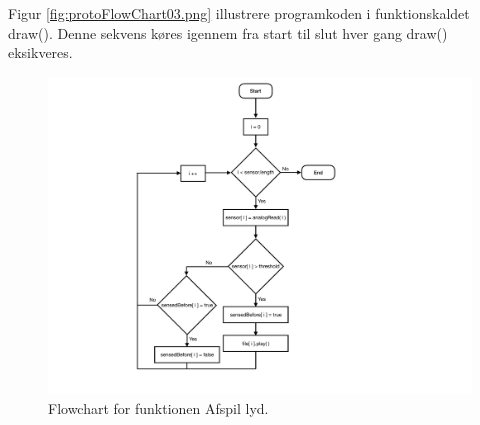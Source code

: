 Figur \ref{fig:protoFlowChart03.png} illustrere programkoden i funktionskaldet draw(). Denne sekvens køres igennem fra start til slut hver gang draw() eksikveres.            

\begin{figure}[H]
\centering
\includegraphics[scale=0.6]{Figure/protoFlowChart03.pdf}
\caption{
Flowchart for funktionen Afspil lyd. }
\label{fig:protoFlowChart03.pdf}
\end{figure}

 
